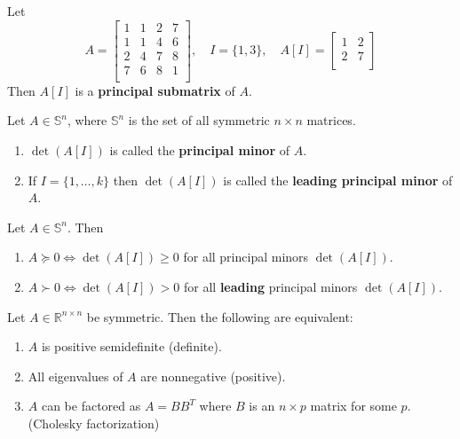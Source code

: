 \begin{definition}
  Let $$A = \begin{bmatrix}
    1 & 1 & 2 & 7 \\
    1 & 1 & 4 & 6 \\
    2 & 4 & 7 & 8 \\
    7 & 6 & 8 & 1 \\
  \end{bmatrix}, \quad I = \{1,3\}, \quad A[I] = \begin{bmatrix}
    1 & 2 \\
    2 & 7 \\
  \end{bmatrix}$$
  Then $A[I]$ is a \textbf{principal submatrix} of $A$.
\end{definition}
\begin{definition}
  Let $A \in \mathbb S^n$, where $\mathbb S^n$ is the set of all symmetric $n \times n$ matrices.
\begin{enumerate}
  \item $\det(A[I])$ is called the \textbf{principal minor} of $A$.
  \item If $I = \{1,\ldots, k\}$ then $\det(A[I])$ is called the \textbf{leading principal minor} of $A$.
\end{enumerate}
\end{definition}
\begin{proposition}
  Let $A \in \mathbb S^n$. Then
  \begin{enumerate}
    \item $A \succeq 0 \iff \det(A[I]) \geq 0$ for all principal minors $\det(A[I])$.
    \item $A \succ 0 \iff \det(A[I]) > 0$ for all \textbf{leading} principal minors $\det(A[I])$.
  \end{enumerate}
\end{proposition}
\begin{theorem}[]
  Let $A \in \mathbb R^{n \times n}$ be symmetric. Then the following are equivalent:
  \begin{enumerate}
    \item $A$ is positive semidefinite (definite).
    \item All eigenvalues of $A$ are nonnegative (positive).
    \item $A$ can be factored as $A = BB^T$ where $B$ is an $n \times p$ matrix for some $p$. (Cholesky factorization)
  \end{enumerate}
\end{theorem}
